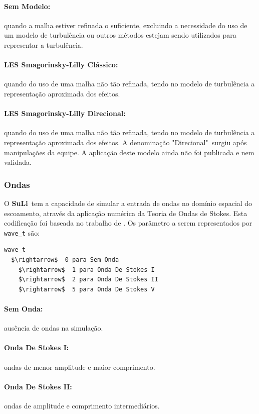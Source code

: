 \documentclass[12pt, a4paper]{article}
\newcommand{\SL}{{\bf SuLi}}
\begin{document}
\paragraph{Sem Modelo:} quando a malha estiver refinada o suficiente, excluindo a necessidade do uso de um modelo de turbulência ou outros métodos estejam sendo utilizados para representar a turbulência.
\paragraph{LES Smagorinsky-Lilly Clássico:} quando do uso de uma malha não tão refinada, tendo no modelo de turbulência a representação aproximada dos efeitos.
\paragraph{LES Smagorinsky-Lilly Direcional:} quando do uso de uma malha não tão refinada, tendo no modelo de turbulência a representação aproximada dos efeitos. A denominação "Direcional"\ surgiu após manipulações da equipe. A aplicação deste modelo ainda não foi publicada e nem validada.

\subsubsection{Ondas}
O \SL\ tem a capacidade de simular a entrada de ondas no domínio espacial do escoamento, através da aplicação numérica da Teoria de Ondas de Stokes. Esta codificação foi baseada no trabalho de \cite{higuera2013}. Os parâmetro a serem representados por \verb|wave_t| são:
\begin{lstlisting}[escapeinside='']
wave_t	
  $\rightarrow$  0 para Sem Onda
	$\rightarrow$  1 para Onda De Stokes I
	$\rightarrow$  2 para Onda De Stokes II
	$\rightarrow$  5 para Onda De Stokes V
\end{lstlisting}

\paragraph{Sem Onda:} ausência de ondas na simulação.
\paragraph{Onda De Stokes I:} ondas de menor amplitude e maior comprimento.
\paragraph{Onda De Stokes II:} ondas de amplitude e comprimento intermediários.
\end{document}
